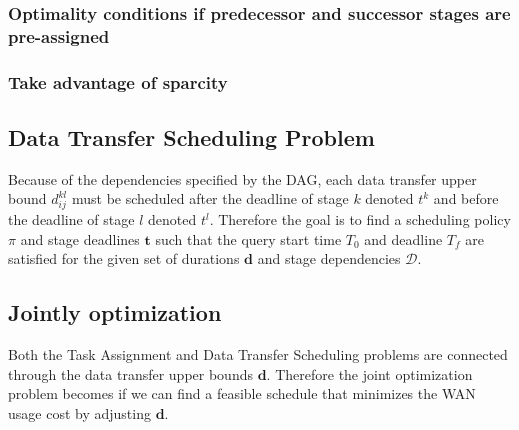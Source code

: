 \subsubsection{Optimality conditions if predecessor and successor stages are pre-assigned} \todo{}

\subsubsection{Take advantage of sparcity} \todo{}

\subsection{Data Transfer Scheduling Problem}

Because of the dependencies specified by the DAG, each data transfer upper bound $d_{ij}^{kl}$ must be scheduled after the deadline of stage $k$ denoted $t^k$ and before the deadline of stage $l$ denoted $t^l$.
Therefore the goal is to find a scheduling policy $\pi$ and stage deadlines $\mathbf{t}$ such that the query start time $T_0$ and deadline $T_f$ are satisfied for the given set of durations $\mathbf{d}$ and stage dependencies $\mathcal{D}$.

\subsection{Jointly optimization}

Both the Task Assignment and Data Transfer Scheduling problems are connected through the data transfer upper bounds $\mathbf{d}$.
Therefore the joint optimization problem becomes if we can find a feasible schedule that minimizes the WAN usage cost by adjusting $\mathbf{d}$.